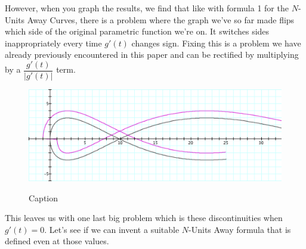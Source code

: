 However, when you graph the results, we find that like with formula 1 for the $N$-Units Away Curves, there is a problem where the graph we've so far made flips which side of the original parametric function we're on. It
switches sides inappropriately every time $g'(t)$ changes sign. Fixing this is a problem we have already previously encountered in this paper and can be rectified by multiplying by a $\dfrac{g'(t)}{|g'(t)|}$ term.

\renewcommand\w{0.9\linewidth}

\begin{figure}[h]
  \begin{minipage}[b]{\w}
      \centering
      \label{parametric:1}
      \includegraphics[width=\w]{img/15-parametric/01.png}
      \caption{Caption}
  \end{minipage}
\end{figure}

This leaves us with one last big problem which is these discontinuities when $g'(t) = 0$. Let's see if we can invent a suitable $N$-Units Away formula that is defined even at those values.

